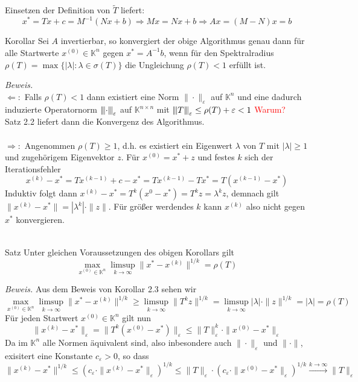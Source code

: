 \documentclass{article}
\begin{document}
Einsetzen der Definition von $\tilde{T}$ liefert:
\[x^*=Tx+c=M^{-1}(Nx+b)\Rightarrow Mx=Nx+b \Rightarrow Ax=(M-N)x=b\]
\begin{thmbox}{Korollar}
    Sei $A$ invertierbar, so konvergiert der obige Algorithmus genau dann für alle Startwerte $x^{(0)}\in\mathbb{K}^n$ gegen $x^*=A^{-1}b$, wenn für den Spektralradius $\rho(T)=\max\{|\lambda|:\lambda\in\sigma(T)\}$ die Ungleichung $\rho(T)<1$ erfüllt ist.
\end{thmbox}
\textit{Beweis.} \\
$\Leftarrow:$ Falls $\rho(T)<1$ dann existiert eine Norm $\|\cdot\|_\varepsilon$ auf $\mathbb{K}^n$ und eine dadurch induzierte Operatornorm ${\left\vert\kern-0.25ex\left\vert\kern-0.25ex\left\vert \cdot \right\vert\kern-0.25ex\right\vert\kern-0.25ex\right\vert}_\varepsilon$ auf $\mathbb{K}^{n\times n}$ mit ${\left\vert\kern-0.25ex\left\vert\kern-0.25ex\left\vert T \right\vert\kern-0.25ex\right\vert\kern-0.25ex\right\vert}_\varepsilon \leq \rho(T) + \varepsilon < 1$ \textcolor{red}{Warum?} \\
Satz 2.2 liefert dann die Konvergenz des Algorithmus. \\ \\
$\Rightarrow:$ Angenommen $\rho(T)\geq 1$, d.h. es existiert ein Eigenwert $\lambda$ von $T$ mit $|\lambda|\geq 1$ und zugehörigem Eigenvektor $z$. Für $x^{(0)}=x^*+z$ und festes $k$ sich der Iterationsfehler
\[x^{(k)}-x^* = Tx^{(k-1)}+c-x^* = Tx^{(k-1)}-Tx^* = T(x^{(k-1)}-x^*)\]
Induktiv folgt dann $x^{(k)}-x^* = T^k(x^{0}-x^*)=T^kz=\lambda^kz$, demnach gilt 
$\|x^{(k)}-x^*\|=|\lambda^k|\cdot\|z\|$.
Für größer werdendes $k$ kann $x^{(k)}$ also nicht gegen $x^*$ konvergieren. \\ \\
\begin{thmbox}{Satz}
    Unter gleichen Voraussetzungen des obigen Korollars gilt 
    \[\max_{x^{(0)}\in\mathbb{K}^n} \limsup_{k\rightarrow \infty} \|x^*-x^{(k)}\|^{1/k}=\rho(T)\]
\end{thmbox}
\textit{Beweis.}
Aus dem Beweis von Korollar 2.3 sehen wir
\[\max_{x^{(0)}\in\mathbb{K}^n} \limsup_{k\rightarrow \infty} \|x^*-x^{(k)}\|^{1/k}\geq\limsup_{k\rightarrow\infty} \|T^kz\|^{1/k}=\limsup_{k\rightarrow\infty}|\lambda|\cdot\|z\|^{1/k}=|\lambda|=\rho(T)\]
Für jeden Startwert $x^{(0)}\in\mathbb{K}^n$ gilt nun 
\[\|x^{(k)}-x^*\|_\varepsilon = \|T^k(x^{(0)}-x^*)\|_\varepsilon\leq \|T\|_\varepsilon^k\cdot \|x^{(0)}-x^*\|_\varepsilon\]
Da im $\mathbb{K}^n$ alle Normen äquivalent sind, also inbesondere auch $\|\cdot\|_\varepsilon$ und $\|\cdot\|$, exisitert eine Konstante $c_\varepsilon>0$, so dass
\[\|x^{(k)}-x^*\|^{1/k}\leq\left(c_\varepsilon\cdot\|x^{(k)}-x^*\|_\varepsilon\right)^{1/k}\leq \|T\|_\varepsilon\cdot\left(c_\varepsilon\cdot\|x^{(0)}-x^*\|_\varepsilon\right)^{1/k}\xrightarrow{k\rightarrow\infty} \|T\|_\varepsilon\]
\end{document}
